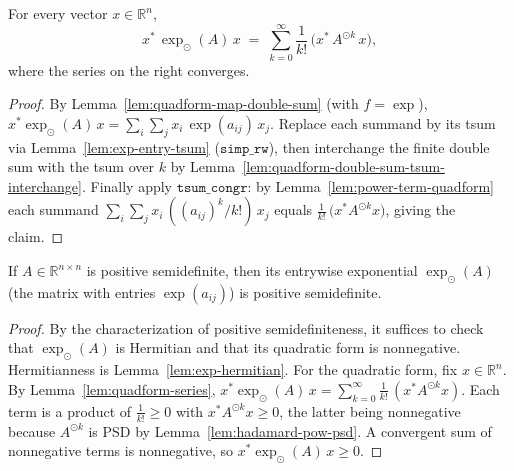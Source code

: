 \begin{lemma}
    \label{lem:quadform-series}
    \leanok
    For every vector $x \in \mathbb{R}^n$,
    \[
        x^{*} \, \exp_{\odot}(A) \, x
        \;=\; \sum_{k=0}^{\infty} \frac{1}{k!}\,\bigl(x^{*}\, A^{\odot k}\, x\bigr),
    \]
    where the series on the right converges.
\end{lemma}
\begin{proof}
    By Lemma~\ref{lem:quadform-map-double-sum} (with $f = \exp$),
    $x^{*}\exp_{\odot}(A)\,x = \sum_i \sum_j x_i\, \exp(a_{ij})\, x_j$. Replace each
    summand by its tsum via Lemma~\ref{lem:exp-entry-tsum} ($\texttt{simp\_rw}$),
    then interchange the finite double sum with the tsum over $k$ by
    Lemma~\ref{lem:quadform-double-sum-tsum-interchange}. Finally apply
    $\texttt{tsum\_congr}$: by Lemma~\ref{lem:power-term-quadform} each summand
    $\sum_i \sum_j x_i\, ((a_{ij})^k/k!)\, x_j$ equals
    $\tfrac{1}{k!}\,\bigl(x^{*} A^{\odot k} x\bigr)$, giving the claim.
\end{proof}

\begin{theorem}
    \label{thm:posSemidef-map-exp}
    \leanok
    If $A \in \mathbb{R}^{n \times n}$ is positive semidefinite, then its
    entrywise exponential $\exp_{\odot}(A)$ (the matrix with entries
    $\exp(a_{ij})$) is positive semidefinite.
\end{theorem}
\begin{proof}
    By the characterization of positive semidefiniteness, it suffices to check
    that $\exp_{\odot}(A)$ is Hermitian and that its quadratic form is
    nonnegative. Hermitianness is Lemma~\ref{lem:exp-hermitian}. For the
    quadratic form, fix $x \in \mathbb{R}^n$. By
    Lemma~\ref{lem:quadform-series},
    $x^{*}\exp_{\odot}(A)\,x = \sum_{k=0}^{\infty} \frac{1}{k!}\,(x^{*} A^{\odot k} x)$.
    Each term is a product of $\frac{1}{k!} \ge 0$ with $x^{*} A^{\odot k} x \ge 0$,
    the latter being nonnegative because $A^{\odot k}$ is PSD by
    Lemma~\ref{lem:hadamard-pow-psd}. A convergent sum of nonnegative terms is
    nonnegative, so $x^{*}\exp_{\odot}(A)\,x \ge 0$.
\end{proof}
